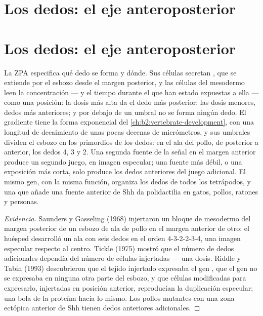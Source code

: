 \section{Los dedos: el eje anteroposterior}
\section{Los dedos: el eje anteroposterior}

\begin{proposition}\label{prop:b2:limb-organogenesis:zpa}
La ZPA especifica qué dedo se forma y dónde. Sus células secretan , que se extiende por el esbozo desde el margen posterior, y las
células del mesodermo leen la concentración --- y el tiempo durante el
que han estado expuestas a ella --- como una posición: la dosis más alta
da el dedo más posterior; las dosis menores, dedos más anteriores; y por
debajo de un umbral no se forma ningún dedo. El gradiente tiene la forma
exponencial del \cref{ch:b2:vertebrate-development}, con una longitud de
decaimiento de unas pocas decenas de micrómetros, y sus umbrales dividen
el esbozo en los primordios de los dedos: en el ala del pollo, de
posterior a anterior, los dedos 4, 3 y 2. Una segunda fuente de la señal
en el margen anterior produce un segundo juego, en imagen especular; una
fuente más débil, o una exposición más corta, solo produce los dedos
anteriores del juego adicional. El mismo gen, con la misma función,
organiza los dedos de todos los tetrápodos, y una  que añade una
fuente anterior de Shh da polidactilia en gatos, pollos, ratones y
personas.
\end{proposition}
\begin{proof}[Evidencia]
Saunders y Gasseling (1968) injertaron un bloque de mesodermo del margen
posterior de un esbozo de ala de pollo en el margen anterior de otro: el
huésped desarrolló un ala con seis dedos en el orden 4-3-2-2-3-4, una
imagen especular respecto al centro. Tickle (1975) mostró que el número de
dedos adicionales dependía del número de células injertadas --- una
dosis. Riddle y Tabin (1993) descubrieron que el tejido injertado
expresaba el gen \emph{}, que el gen no se expresaba en
ninguna otra parte del esbozo, y que células modificadas para expresarlo,
injertadas en posición anterior, reproducían la duplicación especular;
una bola de la proteína hacía lo mismo. Los pollos mutantes con una zona
ectópica anterior de Shh tienen dedos anteriores adicionales.
\end{proof}

